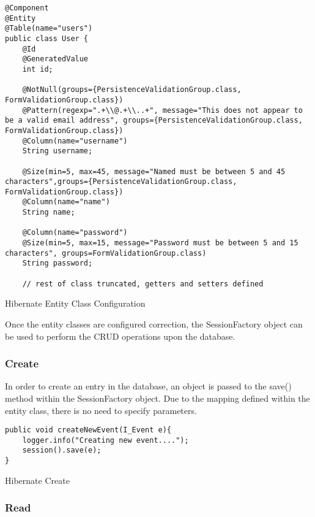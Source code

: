 \begin{table}[H]
\begin{lstlisting}
@Component
@Entity
@Table(name="users")
public class User {
	@Id
	@GeneratedValue
	int id;
	
	@NotNull(groups={PersistenceValidationGroup.class, FormValidationGroup.class})
	@Pattern(regexp=".+\\@.+\\..+", message="This does not appear to be a valid email address", groups={PersistenceValidationGroup.class, FormValidationGroup.class})
	@Column(name="username")
	String username;
	
	@Size(min=5, max=45, message="Named must be between 5 and 45 characters",groups={PersistenceValidationGroup.class, FormValidationGroup.class})
	@Column(name="name")
	String name;
	
	@Column(name="password")
	@Size(min=5, max=15, message="Password must be between 5 and 15 characters", groups=FormValidationGroup.class)
	String password;
	
	// rest of class truncated, getters and setters defined
\end{lstlisting}
\caption{Hibernate Entity Class Configuration}
\end{table}
	
Once the entity classes are configured correction, the SessionFactory object can be used to perform the CRUD operations upon the database.
	
\subsubsection{Create}

In order to create an entry in the database, an object is passed to the save() method within the SessionFactory object. Due to the mapping defined within the entity class, there is no need to specify parameters.

\begin{table}[H]
\begin{lstlisting}
public void createNewEvent(I_Event e){
	logger.info("Creating new event....");
	session().save(e);
}
\end{lstlisting}
\caption{Hibernate Create}
\end{table}

\subsubsection{Read}

